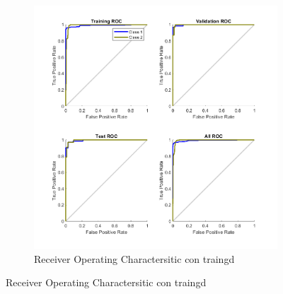 \documentclass[a4paper, 12pt]{article}
\begin{document}
\begin{figure}[htp!]
\begin{subfigure}{0.49\textwidth}
                        \includegraphics[width=\textwidth]{figures/parte1/Ej4/ej4_roc_traingd.png}
                        \caption{Receiver Operating Charactersitic con traingd}
                    \end{subfigure}
                \end{figure}

            \newpage
\end{document}
